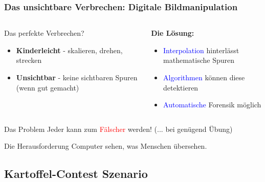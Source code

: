 \documentclass[11pt,t,usepdftitle=false,aspectratio=169]{beamer}
\begin{document}
\begin{frame}
	\frametitle{Das unsichtbare Verbrechen: Digitale Bildmanipulation}
	
	\begin{columns}[T]
		\begin{column}{0.45\textwidth}
			\begin{exampleblock}{Das perfekte Verbrechen?}
				\begin{itemize}
					\item \textbf{Kinderleicht} - skalieren, drehen, strecken
					\item \textbf{Unsichtbar} - keine sichtbaren Spuren (wenn gut gemacht)
				\end{itemize}
			\end{exampleblock}
		\end{column}
		\begin{column}{0.48\textwidth}
			\textbf{Die Lösung:}
			\begin{itemize}
				\item \textcolor{blue}{Interpolation} hinterlässt mathematische Spuren
				\item \textcolor{blue}{Algorithmen} können diese detektieren
				\item \textcolor{blue}{Automatische} Forensik möglich
			\end{itemize}
		\end{column}
	\end{columns}
	
	\vspace{0.5em}
	
	\begin{alertblock}{Das Problem}
		Jeder kann zum \textcolor{red}{Fälscher} werden! (... bei genügend Übung)
	\end{alertblock}
	
	\begin{block}{Die Herausforderung}
		Computer sehen, was Menschen übersehen.
	\end{block}
\end{frame}

\subsection{Kartoffel-Contest Szenario}
\end{document}
